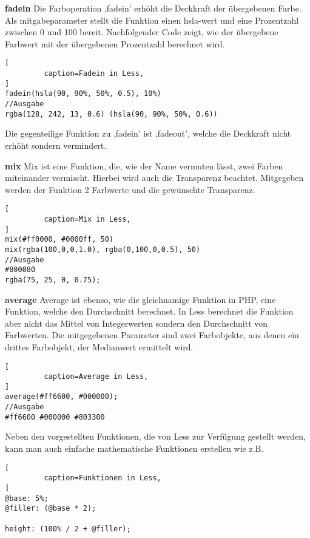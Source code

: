 \textbf{fadein}\newline
Die Farboperation ,fadein' erhöht die Deckkraft der übergebenen Farbe. Als mitgabeparameter stellt die Funktion einen hsla-wert und eine Prozentzahl zwischen 0 und 100 bereit. Nachfolgender Code zeigt, wie der übergebene Farbwert mit der übergebenen Prozentzahl berechnet wird.
\begin{lstlisting}[
         caption=Fadein in Less,
]
fadein(hsla(90, 90%, 50%, 0.5), 10%)
//Ausgabe
rgba(128, 242, 13, 0.6) (hsla(90, 90%, 50%, 0.6))
\end{lstlisting}
Die gegenteilige Funktion zu ,fadein' ist ,fadeout', welche die Deckkraft nicht erhöht sondern vermindert.

\textbf{mix}\newline
Mix ist eine Funktion, die, wie der Name vermuten lässt, zwei Farben miteinander vermischt. Hierbei wird auch die Transparenz beachtet. Mitgegeben werden der Funktion 2 Farbwerte und die gewünschte Transparenz.
\begin{lstlisting}[
         caption=Mix in Less,
]
mix(#ff0000, #0000ff, 50)
mix(rgba(100,0,0,1.0), rgba(0,100,0,0.5), 50)
//Ausgabe
#800080
rgba(75, 25, 0, 0.75);
\end{lstlisting}

\textbf{average}\newline
Average ist ebenso, wie die gleichnamige Funktion in PHP, eine Funktion, welche den Durchschnitt berechnet. In Less berechnet die Funktion aber nicht das Mittel von Integerwerten sondern den Durchschnitt von Farbwerten. Die mitgegebenen Parameter sind zwei Farbobjekte, aus denen ein drittes Farbobjekt, der Medianwert ermittelt wird.
\begin{lstlisting}[
         caption=Average in Less,
]
average(#ff6600, #000000);
//Ausgabe
#ff6600 #000000 #803300
\end{lstlisting}
\autocite[]{Sellier.2013}

Neben den vorgestellten Funktionen, die von Less zur Verfügung gestellt werden, kann man auch einfache mathematische Funktionen erstellen wie z.B.
\begin{lstlisting}[
         caption=Funktionen in Less,
]
@base: 5%;
@filler: (@base * 2);

height: (100% / 2 + @filler);
\end{lstlisting}

